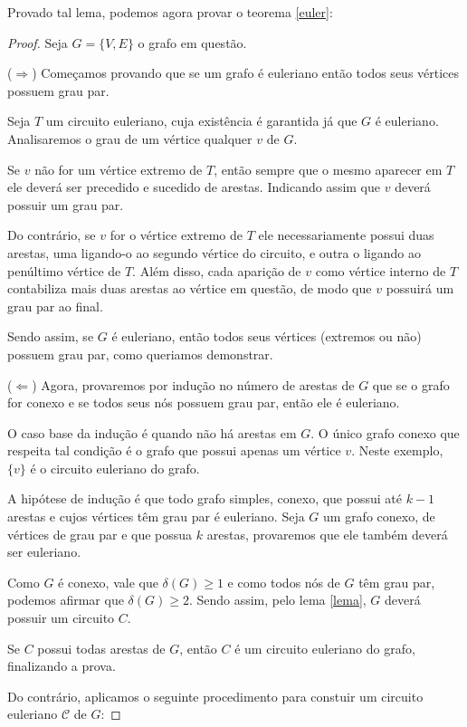 \documentclass[12pt, a4paper]{article}
\begin{document}
Provado tal lema, podemos agora provar o teorema \ref{euler}:

\begin{proof}

Seja $G = \{V, E\}$ o grafo em questão.

($\Rightarrow$) Começamos provando que se um grafo é euleriano então todos seus vértices possuem grau par.

Seja $T$ um circuito euleriano, cuja existência é garantida já que $G$ é euleriano. Analisaremos o grau de um vértice qualquer $v$ de $G$.

Se $v$ não for um vértice extremo de $T$, então sempre que o mesmo aparecer em $T$ ele deverá ser precedido e sucedido de arestas. Indicando assim que $v$ deverá possuir um grau par.

Do contrário, se $v$ for o vértice extremo de $T$ ele necessariamente possui duas arestas, uma ligando-o ao segundo vértice do circuito, e outra o ligando ao penúltimo vértice de $T$. 
Além disso, cada aparição de $v$ como vértice interno de $T$ contabiliza mais duas arestas ao vértice em questão, de modo que $v$ possuirá um grau par ao final.

Sendo assim, se $G$ é euleriano, então todos seus vértices (extremos ou não) possuem grau par, como queriamos demonstrar.\newline

($\Leftarrow$) Agora, provaremos por indução no número de arestas de $G$ que se o grafo for conexo e se todos seus nós possuem grau par, então ele é euleriano.

O caso base da indução é quando não há arestas em $G$. 
O único grafo conexo que respeita tal condição é o grafo que possui apenas um vértice $v$.
Neste exemplo, $\{v\}$ é o circuito euleriano do grafo.

A hipótese de indução é que todo grafo simples, conexo, que possui até $k-1$ arestas e cujos vértices têm grau par é euleriano. 
Seja $G$ um grafo conexo, de vértices de grau par e que possua $k$ arestas, provaremos que ele também deverá ser euleriano.

Como $G$ é conexo, vale que $\delta(G) \geq 1$ e como todos nós de $G$ têm grau par, podemos afirmar que $\delta(G) \geq 2$. 
Sendo assim, pelo lema \ref{lema}, $G$ deverá possuir um circuito $C$.

Se $C$ possui todas arestas de $G$, então $C$ é um circuito euleriano do grafo, finalizando a prova.

Do contrário, aplicamos o seguinte procedimento para constuir um circuito euleriano $\mathcal{C}$ de $G$:


\end{proof}
\end{document}
